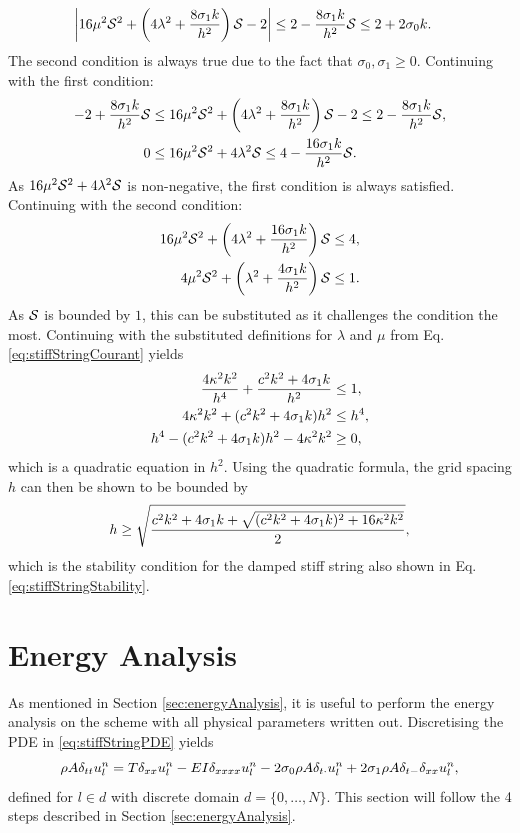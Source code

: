 {\begin{equation}
\begin{aligned}
        \left|16\mu^2\S^2+\left(4\lambda^2+\frac{8\so k}{h^2}\right)\S - 2\right|&\leq2-\frac{8\so k}{h^2}\S\leq2+2\sz k.
    \end{aligned}
\end{equation}
The second condition is always true due to the fact that $\sigma_0,\sigma_1 \geq 0$. Continuing with the first condition: 
\begin{align*}
    -2+\frac{8\so k}{h^2}\S&\leq 16\mu^2\S^2+\left(4\lambda^2+\frac{8\so k}{h^2}\right)\S - 2\leq 2-\frac{8\so k}{h^2}\S,\\
    0&\leq 16\mu^2\S^2+4\lambda^2\S\leq 4-\frac{16\so k}{h^2}\S.
\end{align*}
As $16\mu^2\S^2+4\lambda^2\S$ is non-negative, the first condition is always satisfied. Continuing with the second condition:
\begin{align*}
    16\mu^2\S^2+\left(4\lambda^2+ \frac{16\so k}{h^2}\right)\S &\leq 4,\\
    4\mu^2\S^2+\left(\lambda^2+ \frac{4\so k}{h^2}\right)\S&\leq 1.
\end{align*}
As $\S$ is bounded by $1$, this can be substituted as it challenges the condition the most.  Continuing with the substituted definitions for $\lambda$ and $\mu$ from Eq. \eqref{eq:stiffStringCourant} yields
\begin{align*}
    \frac{4\kappa^2k^2}{h^4}+\frac{c^2k^2 + 4\so k}{h^2}&\leq 1, \\
    4\kappa^2k^2+(c^2k^2+ 4\so k)h^2&\leq h^4,\\
    h^4- (c^2k^2+ 4\so k)h^2 - 4\kappa^2k^2 &\geq 0 ,
\end{align*}
which is a quadratic equation in $h^2$. Using the quadratic formula, the grid spacing $h$ can then be shown to be bounded by
\begin{equation}
    h \geq \sqrt{\frac{c^2k^2+4\so k + \sqrt{(c^2k^2 + 4\so k)^2+16\kappa^2k^2}}{2}},
\end{equation}
which is the stability condition for the damped stiff string also shown in Eq. \eqref{eq:stiffStringStability}.

\section{Energy Analysis}\label{sec:energyAnalysisString}
As mentioned in Section \ref{sec:energyAnalysis}, it is useful to perform the energy analysis on the scheme with all physical parameters written out. Discretising the PDE in \eqref{eq:stiffStringPDE} yields
\begin{equation}
    \rho A \dtt \uln = T \dxx \uln - EI \dxxxx \uln - 2\sz \rho A \dtd \uln + 2 \so \rho A \dtm \dxx \uln,
\end{equation}
defined for $l\in d$ with discrete domain $d = \{0, \hdots, N\}$. This section will follow the 4 steps described in Section \ref{sec:energyAnalysis}.

}
